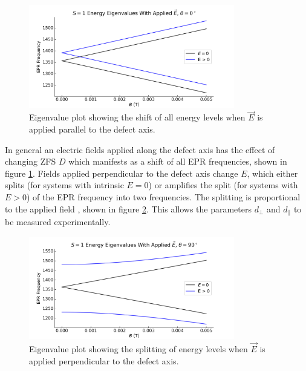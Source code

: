 \begin{figure}[h]
    \begin{center}
        \includegraphics[width=0.8\textwidth]{figures/EFieldParallel.png}
    \end{center}
    \caption{Eigenvalue plot showing the shift of all energy levels when $\vec{E}$ is applied parallel to the defect axis.}
    \label{fig:E_Field_par}
\end{figure}

In general an electric fields applied along the defect axis has the effect of changing ZFS $D$ which manifests as a shift of all EPR frequencies, shown in figure \ref{fig:E_Field_par}. Fields applied perpendicular to the defect axis change $E$, which either splits (for systems with intrinsic $E=0$) or amplifies the split (for systems with $E>0$) of the EPR frequency into two frequencies. The splitting is proportional to the applied field \cite{Acosta2012, Bassett2011}, shown in figure \ref{fig:E_Field_perp}. This allows the parameters $d_\perp$ and $d_\parallel$ to be measured experimentally. 

\begin{figure}[h]
    \begin{center}
        \includegraphics[width=0.8\textwidth]{figures/EFieldPerp.png}
    \end{center}
    \caption{Eigenvalue plot showing the splitting of energy levels when $\vec{E}$ is applied perpendicular to the defect axis.}
    \label{fig:E_Field_perp}
\end{figure}



